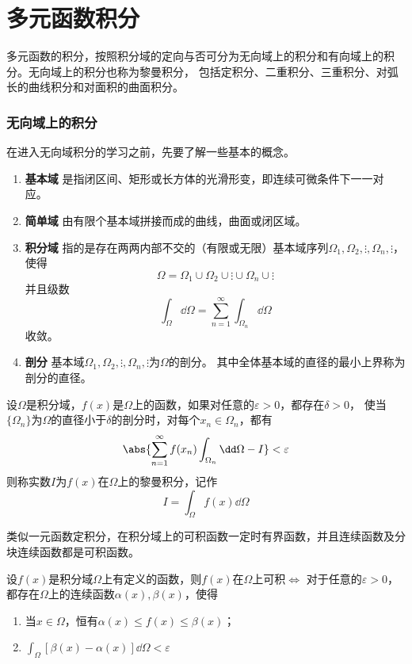 \part{多元函数积分}
多元函数的积分，按照积分域的定向与否可分为无向域上的积分和有向域上的积分。无向域上的积分也称为黎曼积分，
包括定积分、二重积分、三重积分、对弧长的曲线积分和对面积的曲面积分。

\section{无向域上的积分}
在进入无向域积分的学习之前，先要了解一些基本的概念。
\begin{enumerate}
    \item \textbf{\textsf{基本域}} 是指闭区间、矩形或长方体的光滑形变，即连续可微条件下一一对应。
    \item \textbf{\textsf{简单域}} 由有限个基本域拼接而成的曲线，曲面或闭区域。
    \item \textbf{\textsf{积分域}} 指的是存在两两内部不交的（有限或无限）基本域序列$\Omega_1,\Omega_2,\vdots,\Omega_n,\vdots$，
          使得
          \[ \Omega = \Omega_1\cup\Omega_2\cup\vdots\cup\Omega_n\cup\vdots \]
          并且级数
          \[ \int_\Omega \dd\Omega = \sum_{n=1}^\infty \int_{\Omega_n} \dd\Omega \]
          收敛。
    \item \textbf{\textsf{剖分}} 基本域$\Omega_1,\Omega_2,\vdots,\Omega_n,\vdots$为$\Omega$的剖分。
          其中全体基本域的直径的最小上界称为剖分的直径。
\end{enumerate}

\begin{definition}
    设$\Omega$是积分域，$f(x)$是$\Omega$上的函数，如果对任意的$\varepsilon > 0$，都存在$\delta > 0$，
    使当$\{\Omega_n\}$为$\Omega$的直径小于$\delta$的剖分时，对每个$x_n\in\Omega_n$，都有
    \[ \abs{\sum_{n=1}^\infty f(x_n)\int_{\Omega_n} \dd\Omega - I} < \varepsilon \]
    则称实数$I$为$f(x)$在$\Omega$上的黎曼积分，记作
    \[ I = \int_\Omega f(x)\dd{\Omega} \]
\end{definition}

类似一元函数定积分，在积分域上的可积函数一定时有界函数，并且连续函数及分块连续函数都是可积函数。
\begin{theorem}
    设$f(x)$是积分域$\Omega$上有定义的函数，则$f(x)$在$\Omega$上可积$\iff$
    对于任意的$\varepsilon > 0$，都存在$\Omega$上的连续函数$\alpha(x),\beta(x)$，使得
    \begin{enumerate}[(1)]
        \item 当$x\in\Omega$，恒有$\alpha(x)\leq f(x) \leq \beta(x)$；
        \item $\displaystyle \int_\Omega [\beta(x)-\alpha(x)]\dd{\Omega} < \varepsilon$
    \end{enumerate}
\end{theorem}

